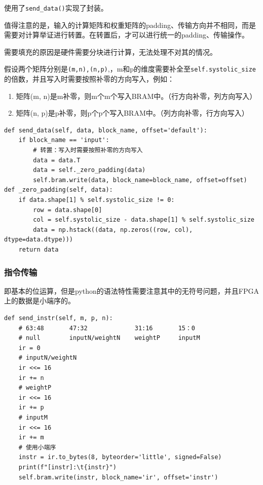 \documentclass[12pt,a4paper]{article}
\begin{document}
使用了\texttt{send\_data()}实现了封装。

值得注意的是，输入的计算矩阵和权重矩阵的padding、传输方向并不相同，而是需要对计算举证进行转置。在转置后，才可以进行统一的padding、传输操作。

需要填充的原因是硬件需要分块进行计算，无法处理不对其的情况。

假设两个矩阵分别是\texttt{(m,n),(n,p)},，m和p的维度需要补全至\texttt{self.systolic\_size}的倍数，并且写入时需要按照补零的方向写入，例如：

\begin{enumerate}
\def\labelenumi{\arabic{enumi}.}
\item
  矩阵(m, n)是m补零，则m个m个写入BRAM中。（行方向补零，列方向写入）
\item
  矩阵(n, p)是p补零，则p个p个写入BRAM中。（列方向补零，行方向写入）
\end{enumerate}

\begin{lstlisting}
def send_data(self, data, block_name, offset='default'):
    if block_name == 'input':
        # 转置：写入时需要按照补零的方向写入
        data = data.T
        data = self._zero_padding(data)
        self.bram.write(data, block_name=block_name, offset=offset)
def _zero_padding(self, data):
    if data.shape[1] % self.systolic_size != 0:
        row = data.shape[0]
        col = self.systolic_size - data.shape[1] % self.systolic_size
        data = np.hstack((data, np.zeros((row, col), dtype=data.dtype)))
    return data
\end{lstlisting}

\subsubsection{指令传输}

即基本的位运算，但是python的语法特性需要注意其中的无符号问题，并且FPGA上的数据是小端序的。

\begin{lstlisting}
def send_instr(self, m, p, n):
    # 63:48       47:32             31:16       15：0
    # null        inputN/weightN    weightP     inputM
    ir = 0
    # inputN/weightN
    ir <<= 16
    ir += n
    # weightP
    ir <<= 16
    ir += p
    # inputM
    ir <<= 16
    ir += m
    # 使用小端序
    instr = ir.to_bytes(8, byteorder='little', signed=False)
    print(f"[instr]:\t{instr}")
    self.bram.write(instr, block_name='ir', offset='instr')
\end{lstlisting}
\end{document}
